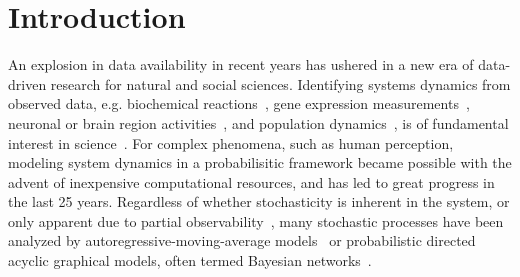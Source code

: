 \documentclass[prx,twocolumn,twoside,showpacs,superscriptaddress]{revtex4-1}
\begin{document}
 
 \maketitle


\section{Introduction}
An explosion in data availability in recent years has ushered in a new era of data-driven research for natural and social sciences.
Identifying systems dynamics from observed data, e.g. biochemical reactions~\cite{Klimovskaia2016}, gene expression measurements~\cite{Bar2012}, neuronal or brain region activities~\cite{dombeck2007imaging,Schneidman2006,Nguyen2016, Bernal-Casas2017}, and population dynamics~\cite{Sugihara2012}, is of fundamental interest in science~\cite{Schmidt2009, Brunton2016, Yair2017,Nguyen2017, Natale2017}.  For complex phenomena, such as human perception, modeling system dynamics in a probabilisitic framework became possible with the advent of inexpensive computational resources, and has led to great progress in the last 25 years. 
Regardless of whether stochasticity is inherent in the system, or only apparent due to partial observability~\cite{Raj2008}, many stochastic processes have been analyzed by autoregressive-moving-average models~\cite{Hamilton1994} or probabilistic directed acyclic graphical models, often termed Bayesian networks~\cite{Friedman2004}.
\end{document}
